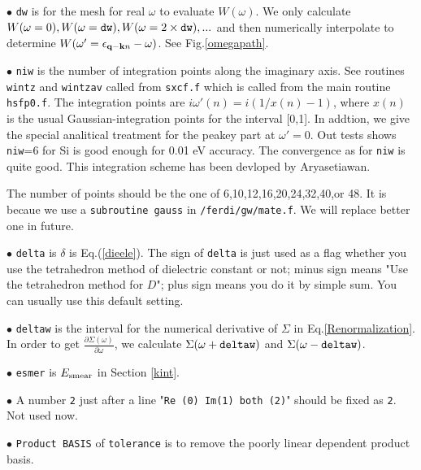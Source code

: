 \documentclass[a4paper,10pt,epsf,fleqn]{article}
\begin{document}
{\vspace{5mm}
\noindent $\bullet$ {\tt dw} is for the mesh for real $\omega$ to evaluate $W(\omega)$.
We only calculate $W(\omega=0), W(\omega={\tt dw}), W(\omega=2 \times {\tt dw}), ...$
and then numerically interpolate to determine $W(\omega'=\epsilon_{{\bf q-k}n}-\omega)$.
See Fig.\ref{omegapath}.

\vspace{5mm}
\noindent $\bullet$ {\tt niw} is the number of integration points along the imaginary axis.
See routines {\tt wintz} and {\tt wintzav} called from {\tt sxcf.f} 
which is called from the main routine {\tt hsfp0.f}. 
The integration points are
$i \omega'(n)= i( 1/x(n) -1)$, where $x(n)$ is
the usual Gaussian-integration points for the interval [0,1].
In addtion, we give the special analitical treatment for
the peakey part at $\omega'=0$.
Out tests shows {\tt niw}=6 for Si is good enough for 0.01 eV accuracy.
The convergence as for {\tt niw} is quite good.
This integration scheme has been devloped by Aryasetiawan.

The number of points 
should be the one of 6,10,12,16,20,24,32,40,or 48. It is becaue
we use a  {\tt subroutine gauss} in {\tt /ferdi/gw/mate.f}. We will
replace better one in future.


\vspace{5mm}
\noindent $\bullet$ {\tt delta} is $\delta$ is Eq.(\ref{dieele}).
The sign of {\tt delta} is just used as a flag whether you use the
tetrahedron method of dielectric constant \cite{rath75} or not; minus sign means
"Use the tetrahedron method for $D$"; plus sign means you do it by simple sum.
You can usually use this default setting.

\vspace{5mm}
\noindent $\bullet$ {\tt deltaw} is the interval for the numerical derivative
of $\Sigma$ in Eq.\ref{Renormalization}. In order to get $\frac{\partial \Sigma(\omega)}{\partial \omega}$,
we calculate $\Sigma(\omega+{\tt deltaw})$ and $\Sigma(\omega-{\tt deltaw})$.

\vspace{5mm}
\noindent $\bullet$ {\tt esmer} is $E_{\rm smear}$ in 
Section \ref{kint}.

\vspace{5mm}
\noindent $\bullet$ A number {\tt 2} just after a line
"{\tt Re (0) Im(1) both (2)}" should be fixed as {\tt 2}. Not used now.

\vspace{5mm}
\noindent $\bullet$ {\tt Product BASIS} of {\tt tolerance} is
to remove the poorly linear dependent product basis.

}
\end{document}
